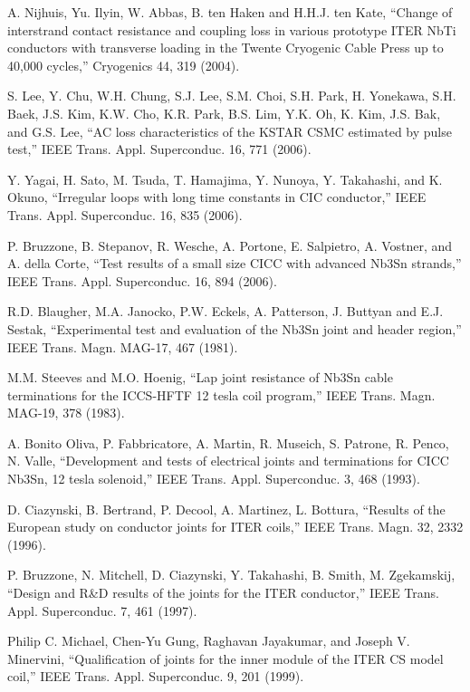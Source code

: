\noindent [6.47] A. Nijhuis, Yu. Ilyin, W. Abbas, B. ten Haken and H.H.J. ten Kate, ``Change of
interstrand contact resistance and coupling loss in various prototype ITER NbTi
conductors with transverse loading in the Twente Cryogenic Cable Press up to
40,000 cycles,” Cryogenics 44, 319 (2004).

\noindent [6.48] S. Lee, Y. Chu, W.H. Chung, S.J. Lee, S.M. Choi, S.H. Park, H. Yonekawa,
S.H. Baek, J.S. Kim, K.W. Cho, K.R. Park, B.S. Lim, Y.K. Oh, K. Kim, J.S. Bak,
and G.S. Lee, ``AC loss characteristics of the KSTAR CSMC estimated by pulse
test,” IEEE Trans. Appl. Superconduc. 16, 771 (2006).

\noindent [6.49] Y. Yagai, H. Sato, M. Tsuda, T. Hamajima, Y. Nunoya, Y. Takahashi, and
K. Okuno, ``Irregular loops with long time constants in CIC conductor,” IEEE
Trans. Appl. Superconduc. 16, 835 (2006).

\noindent [6.50] P. Bruzzone, B. Stepanov, R. Wesche, A. Portone, E. Salpietro, A. Vostner, and
A. della Corte, ``Test results of a small size CICC with advanced Nb3Sn strands,”
IEEE Trans. Appl. Superconduc. 16, 894 (2006).

\noindent [6.51] R.D. Blaugher, M.A. Janocko, P.W. Eckels, A. Patterson, J. Buttyan and E.J. Sestak, ``Experimental test and evaluation of the Nb3Sn joint and header region,”
IEEE Trans. Magn. MAG-17, 467 (1981).

\noindent [6.52] M.M. Steeves and M.O. Hoenig, ``Lap joint resistance of Nb3Sn cable terminations for the ICCS-HFTF 12 tesla coil program,” IEEE Trans. Magn. MAG-19, 378 (1983).

\noindent [6.53] A. Bonito Oliva, P. Fabbricatore, A. Martin, R. Museich, S. Patrone, R. Penco,
N. Valle, ``Development and tests of electrical joints and terminations for CICC
Nb3Sn, 12 tesla solenoid,” IEEE Trans. Appl. Superconduc. 3, 468 (1993).

\noindent [6.54] D. Ciazynski, B. Bertrand, P. Decool, A. Martinez, L. Bottura, ``Results of the
European study on conductor joints for ITER coils,” IEEE Trans. Magn. 32, 2332 (1996).

\noindent [6.55] P. Bruzzone, N. Mitchell, D. Ciazynski, Y. Takahashi, B. Smith, M. Zgekamskij,
``Design and R\&D results of the joints for the ITER conductor,” IEEE Trans. Appl. Superconduc. 7, 461 (1997).

\noindent [6.56] Philip C. Michael, Chen-Yu Gung, Raghavan Jayakumar, and Joseph V. Minervini, ``Qualification of joints for the inner module of the ITER CS model coil,” IEEE Trans. Appl. Superconduc. 9, 201 (1999).

